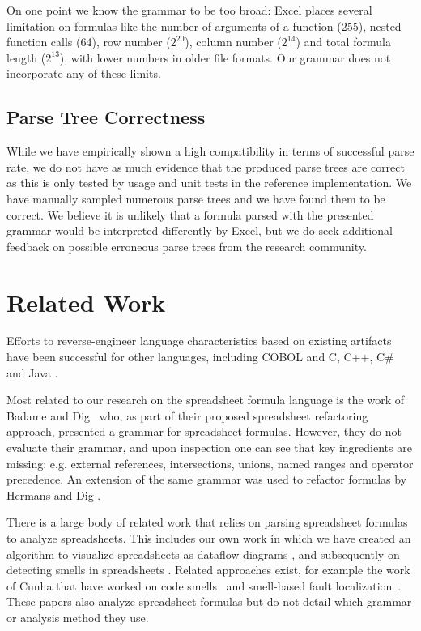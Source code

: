 \documentclass[times]{smrauth}
\begin{document}
On one point we know the grammar to be too broad: Excel places several limitation on formulas like the number of arguments of a function (255), nested function calls (64), row number ($2^{20}$), column number ($2^{14}$) and total formula length ($2^{13}$), with lower numbers in older file formats.
Our grammar does not incorporate any of these limits.

\subsection{Parse Tree Correctness}

While we have empirically shown a high compatibility in terms of successful parse rate, we do not have as much evidence that the produced parse trees are correct as this is only tested by usage and unit tests in the reference implementation. We have manually sampled numerous parse trees and we have found them to be correct. We believe it is unlikely that a formula parsed with the presented grammar would be interpreted differently by Excel, but we do seek additional feedback on possible erroneous parse trees from the research community.

\section{Related Work}
\label{section:relatedWork}
Efforts to reverse-engineer language characteristics based on existing artifacts have been successful for other languages, including COBOL \cite{van1997obtaining} and C, C++, C\# and Java \cite{zaytsev2010recovery}.

Most related to our research on the spreadsheet formula language is the work of Badame and Dig~\cite{badame2012refactoring} who, as part of their proposed spreadsheet refactoring approach, presented a grammar for spreadsheet formulas. However, they do not evaluate their grammar, and upon inspection one can see that key ingredients are missing: e.g. external references, intersections, unions, named ranges and operator precedence. An extension of the same grammar was used to refactor formulas by Hermans and Dig \cite{hermans2014bumblebee}.

There is a large body of related work that relies on parsing spreadsheet formulas to analyze spreadsheets. This includes our own work in which we have created an algorithm to visualize spreadsheets as dataflow diagrams \cite{DBLP:conf/icse/HermansPD11}, and subsequently on detecting smells in spreadsheets \cite{DBLP:conf/icse/HermansPD12,DBLP:conf/icsm/Hermans212}. Related approaches exist, for example the work of Cunha that have worked on code smells~\cite{iccsa12} and smell-based fault localization~\cite{conf/icsme/CunhaFMPS14}. These papers also analyze spreadsheet formulas but do not detail which grammar or analysis method they use.
\end{document}
